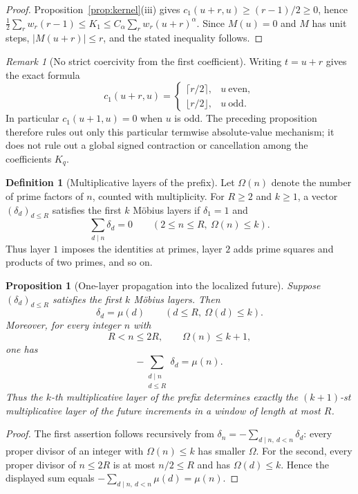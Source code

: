 \documentclass[11pt]{amsart}
\numberwithin{equation}{section}
\theoremstyle{plain}
\newtheorem{proposition}[theorem]{Proposition}
\theoremstyle{definition}
\newtheorem{definition}[theorem]{Definition}
\theoremstyle{remark}
\newtheorem{remark}[theorem]{Remark}
\begin{document}
\begin{proof}
Proposition~\ref{prop:kernel}(iii) gives
$c_1(u+r,u)\ge(r-1)/2\ge0$, hence
$\frac12\sum_rw_r(r-1)\le K_1\le
C_\alpha\sum_rw_r(u+r)^\alpha$. Since $M(u)=0$ and $M$ has unit steps,
$|M(u+r)|\le r$, and the stated inequality follows.
\end{proof}

\begin{remark}[No strict coercivity from the first coefficient]
\label{rem:c1-parity}
Writing $t=u+r$ gives the exact formula
\[
c_1(u+r,u)=
\begin{cases}
\lceil r/2\rceil,&u\ \text{even},\\
\lfloor r/2\rfloor,&u\ \text{odd}.
\end{cases}
\]
In particular $c_1(u+1,u)=0$ when $u$ is odd.  The preceding proposition
therefore rules out only this particular termwise absolute-value mechanism;
it does not rule out a global signed contraction or cancellation among the
coefficients $K_q$.
\end{remark}

\begin{definition}[Multiplicative layers of the prefix]
\label{def:multiplicative-layers}
Let $\Omega(n)$ denote the number of prime factors of $n$, counted with
multiplicity.  For $R\ge2$ and $k\ge1$, a vector
$(\delta_d)_{d\le R}$ satisfies the first $k$ M\"obius layers if
$\delta_1=1$ and
\[
\sum_{d\mid n}\delta_d=0
\qquad(2\le n\le R,\ \Omega(n)\le k).
\]
Thus layer $1$ imposes the identities at primes, layer $2$ adds prime
squares and products of two primes, and so on.
\end{definition}

\begin{proposition}[One-layer propagation into the localized future]
\label{prop:layer-propagation}
Suppose $(\delta_d)_{d\le R}$ satisfies the first $k$ M\"obius layers. Then
\[
\delta_d=\mu(d)\qquad(d\le R,\ \Omega(d)\le k).
\]
Moreover, for every integer $n$ with
\[
R<n\le2R,\qquad\Omega(n)\le k+1,
\]
one has
\[
-\sum_{\substack{d\mid n\\d\le R}}\delta_d=\mu(n).
\]
Thus the $k$-th multiplicative layer of the prefix determines exactly the
$(k+1)$-st multiplicative layer of the future increments in a window of
length at most $R$.
\end{proposition}

\begin{proof}
The first assertion follows recursively from
$\delta_n=-\sum_{d\mid n,\ d<n}\delta_d$: every proper divisor of an
integer with $\Omega(n)\le k$ has smaller $\Omega$.  For the second, every
proper divisor of $n\le2R$ is at most $n/2\le R$ and has
$\Omega(d)\le k$.  Hence the displayed sum equals
$-\sum_{d\mid n,\ d<n}\mu(d)=\mu(n)$.
\end{proof}
\end{document}
